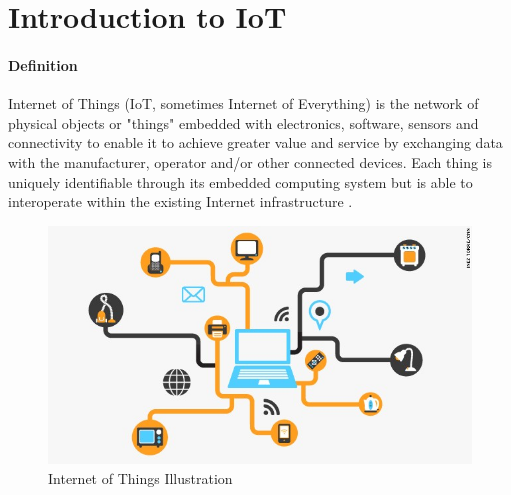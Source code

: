 \documentclass[12pt]{article}
\begin{document}
\maketitle

\section {Introduction to IoT}
\paragraph {Definition} Internet of Things (IoT, sometimes Internet of Everything) is the network of physical objects or "things" embedded with electronics, software, sensors and connectivity to enable it to achieve greater value and service by exchanging data with the manufacturer, operator and/or other connected devices. Each thing is uniquely identifiable through its embedded computing system but is able to interoperate within the existing Internet infrastructure \cite{wiki}.

\begin{figure}
\caption{Internet of Things Illustration}
\includegraphics{iot}

\end{figure}
\end{document}
